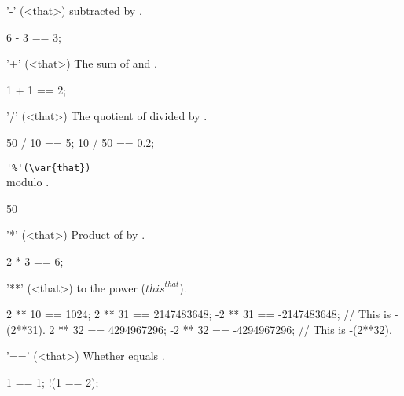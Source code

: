 \begin{urbiscriptapi}
\item['-'](<that>)%
  \this subtracted by .
\begin{urbiassert}
6 - 3 == 3;
\end{urbiassert}

\item['+'](<that>)%
  The sum of \this and .
\begin{urbiassert}
1 + 1 == 2;
\end{urbiassert}

\item['/'](<that>)%
  The quotient of \this divided by .
\begin{urbiassert}
50 / 10 == 5;
10 / 50 == 0.2;
\end{urbiassert}

\item \lstinline|'%'(\var{that})|\\
  \this modulo .
\begin{urbiassert}
50 %
\end{urbiassert}

\item['*'](<that>)%
  Product of \this by .
\begin{urbiassert}
2 * 3 == 6;
\end{urbiassert}

\item['**'](<that>)%
  \this to the  power (${this}^{that}$).
\begin{urbiassert}
 2 ** 10 == 1024;
 2 ** 31 == 2147483648;
-2 ** 31 == -2147483648; // This is -(2**31).
 2 ** 32 == 4294967296;
-2 ** 32 == -4294967296; // This is -(2**32).
\end{urbiassert}

\item['=='](<that>)%
  Whether \this equals .
\begin{urbiassert}
  1 == 1;
!(1 == 2);
\end{urbiassert}
\end{urbiscriptapi}

